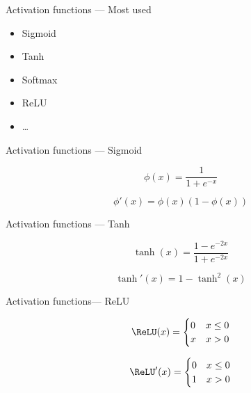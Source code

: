 \begin{frame}{Activation functions --- Most used}
  \begin{itemize}
  \item Sigmoid
  \item Tanh
  \item Softmax
  \item ReLU
  \item …
  \end{itemize}
\end{frame}

\begin{frame}{Activation functions --- Sigmoid}
  \begin{center}
  \end{center}

  \begin{description}[<+->]
    \item[Definition] \[\phi(x) = \frac{1}{1 + e^{-x}}\]
    \item[Derivative] \[\phi'(x)=\phi(x)(1-\phi(x))\]
  \end{description}
\end{frame}

\begin{frame}{Activation functions --- Tanh}
  \begin{center}
  \end{center}

  \begin{description}[<+->]
    \item[Definition] \[\tanh(x)=\frac{1-e^{-2x}}{1+e^{-2x}}\]
    \item[Derivative] \[\tanh'(x)=1-\tanh^2(x)\]
  \end{description}
\end{frame}

\begin{frame}{Activation functions--- ReLU}
  \begin{center}
  \end{center}

  \begin{description}[<+->]
    \item[Definition] \[\ReLU(x)=\begin{cases} 0 & x \leq 0 \\ x & x > 0\end{cases}\]
    \item[Derivative] \[\ReLU'(x)=\begin{cases} 0 & x \leq 0 \\ 1 & x > 0\end{cases}\]
  \end{description}
\end{frame}

